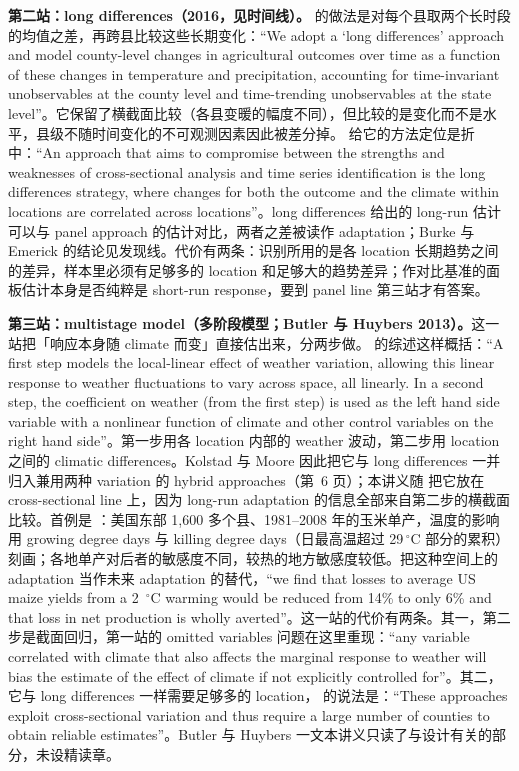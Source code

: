 \textbf{第二站：long differences（2016，见时间线）。}\citet{burke2016adaptation} 的做法是对每个县取两个长时段的均值之差，再跨县比较这些长期变化：``We adopt a `long differences' approach and model county-level changes in agricultural outcomes over time as a function of these changes in temperature and precipitation, accounting for time-invariant unobservables at the county level and time-trending unobservables at the state level''\citep[第~107 页]{burke2016adaptation}。它保留了横截面比较（各县变暖的幅度不同），但比较的是变化而不是水平，县级不随时间变化的不可观测因素因此被差分掉。\citet{hsiang2016climate} 给它的方法定位是折中：``An approach that aims to compromise between the strengths and weaknesses of cross-sectional analysis and time series identification is the long differences strategy, where changes for both the outcome and the climate within locations are correlated across locations''\citep[第~7 页]{hsiang2016climate}。long differences 给出的 long-run 估计可以与 panel approach 的估计对比，两者之差被读作 adaptation；Burke 与 Emerick 的结论见发现线。代价有两条：识别所用的是各 location 长期趋势之间的差异，样本里必须有足够多的 location 和足够大的趋势差异；作对比基准的面板估计本身是否纯粹是 short-run response，要到 panel line 第三站才有答案。

\textbf{第三站：multistage model（多阶段模型；Butler 与 Huybers 2013）。}这一站把「响应本身随 climate 而变」直接估出来，分两步做。\citet{kolstad2019estimating} 的综述这样概括：``A first step models the local-linear effect of weather variation, allowing this linear response to weather fluctuations to vary across space, all linearly. In a second step, the coefficient on weather (from the first step) is used as the left hand side variable with a nonlinear function of climate and other control variables on the right hand side''\citep[第~11 页，NBER w25537 版页码]{kolstad2019estimating}。第一步用各 location 内部的 weather 波动，第二步用 location 之间的 climatic differences。Kolstad 与 Moore 因此把它与 long differences 一并归入兼用两种 variation 的 hybrid approaches（第~6 页）；本讲义随 \citet{da2024climate} 把它放在 cross-sectional line 上，因为 long-run adaptation 的信息全部来自第二步的横截面比较。首例是 \citet{butler2013adaptation}：美国东部 1{,}600 多个县、1981--2008 年的玉米单产，温度的影响用 growing degree days 与 killing degree days（日最高温超过 29\,$^\circ$C 部分的累积）刻画；各地单产对后者的敏感度不同，较热的地方敏感度较低。把这种空间上的 adaptation 当作未来 adaptation 的替代，``we find that losses to average US maize yields from a 2~$^\circ$C warming would be reduced from 14\% to only 6\% and that loss in net production is wholly averted''\citep[第~68 页]{butler2013adaptation}。这一站的代价有两条。其一，第二步是截面回归，第一站的 omitted variables 问题在这里重现：``any variable correlated with climate that also affects the marginal response to weather will bias the estimate of the effect of climate if not explicitly controlled for''\citep[第~12 页]{kolstad2019estimating}。其二，它与 long differences 一样需要足够多的 location，\citet{da2024climate} 的说法是：``These approaches exploit cross-sectional variation and thus require a large number of counties to obtain reliable estimates''\citep[第~825 页]{da2024climate}。Butler 与 Huybers 一文本讲义只读了与设计有关的部分，未设精读章。


